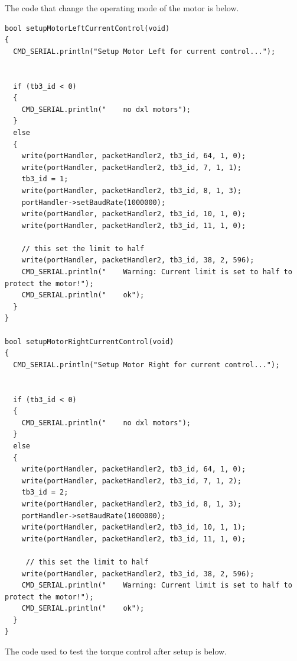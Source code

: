 \documentclass[12]{article}
\begin{document}
The code that change the operating mode of the motor is below. 

\begin{lstlisting}[style=c++]
bool setupMotorLeftCurrentControl(void)
{
  CMD_SERIAL.println("Setup Motor Left for current control...");


  if (tb3_id < 0)
  {
    CMD_SERIAL.println("    no dxl motors");
  }
  else
  {
    write(portHandler, packetHandler2, tb3_id, 64, 1, 0);
    write(portHandler, packetHandler2, tb3_id, 7, 1, 1);
    tb3_id = 1;
    write(portHandler, packetHandler2, tb3_id, 8, 1, 3);
    portHandler->setBaudRate(1000000);
    write(portHandler, packetHandler2, tb3_id, 10, 1, 0);
    write(portHandler, packetHandler2, tb3_id, 11, 1, 0);

    // this set the limit to half
    write(portHandler, packetHandler2, tb3_id, 38, 2, 596);
    CMD_SERIAL.println("    Warning: Current limit is set to half to protect the motor!");
    CMD_SERIAL.println("    ok");
  }
}

bool setupMotorRightCurrentControl(void)
{
  CMD_SERIAL.println("Setup Motor Right for current control...");


  if (tb3_id < 0)
  {
    CMD_SERIAL.println("    no dxl motors");
  }
  else
  {
    write(portHandler, packetHandler2, tb3_id, 64, 1, 0);
    write(portHandler, packetHandler2, tb3_id, 7, 1, 2);
    tb3_id = 2;
    write(portHandler, packetHandler2, tb3_id, 8, 1, 3);
    portHandler->setBaudRate(1000000);
    write(portHandler, packetHandler2, tb3_id, 10, 1, 1);
    write(portHandler, packetHandler2, tb3_id, 11, 1, 0);

     // this set the limit to half
    write(portHandler, packetHandler2, tb3_id, 38, 2, 596);
    CMD_SERIAL.println("    Warning: Current limit is set to half to protect the motor!");
    CMD_SERIAL.println("    ok");
  }
}
\end{lstlisting}

The code used to test the torque control after setup is below. 
\end{document}
